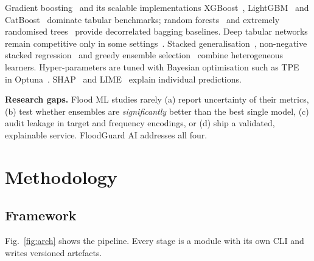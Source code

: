\documentclass[conference]{IEEEtran}
\begin{document}
Gradient boosting~\cite{friedman2001} and its scalable implementations XGBoost~\cite{chen2016}, LightGBM~\cite{ke2017} and
CatBoost~\cite{prokhorenkova2018} dominate tabular benchmarks; random forests~\cite{breiman2001} and extremely randomised
trees~\cite{geurts2006} provide decorrelated bagging baselines. Deep tabular networks remain competitive only in some
settings~\cite{grinsztajn2022,shwartz2022}. Stacked generalisation~\cite{wolpert1992}, non-negative stacked
regression~\cite{breiman1996} and greedy ensemble selection~\cite{caruana2004} combine heterogeneous learners.
Hyper-parameters are tuned with Bayesian optimisation such as TPE~\cite{bergstra2011} in Optuna~\cite{akiba2019}.
SHAP~\cite{lundberg2017,lundberg2020} and LIME~\cite{ribeiro2016} explain individual predictions.

\textbf{Research gaps.} Flood ML studies rarely (a) report uncertainty of their metrics, (b) test whether ensembles are
\emph{significantly} better than the best single model, (c) audit leakage in target and frequency encodings, or
(d) ship a validated, explainable service. FloodGuard AI addresses all four.

\section{Methodology}
\subsection{Framework}
Fig.~\ref{fig:arch} shows the pipeline. Every stage is a module with its own CLI and writes versioned artefacts.
\end{document}
